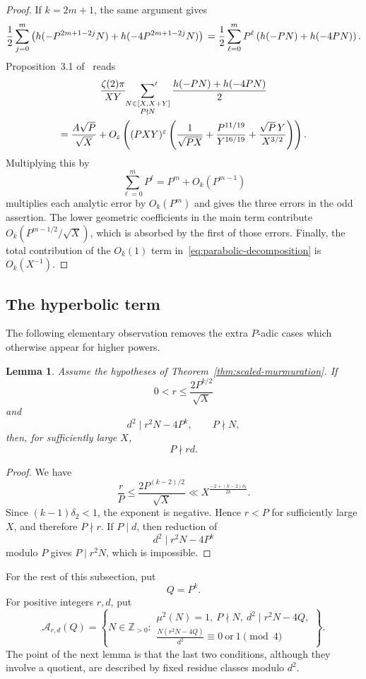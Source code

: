 \documentclass[12pt,reqno]{amsart}
\numberwithin{equation}{section}
\theoremstyle{plain}
\newtheorem{lemma}[theorem]{Lemma}
\theoremstyle{definition}
\theoremstyle{remark}
\begin{document}
\begin{proof}
If $k=2m+1$, the same argument gives
\[
\frac12
\sum_{j=0}^{m}
\left(
h(-P^{2m+1-2j}N)+h(-4P^{2m+1-2j}N)
\right)
\\
=
\frac12
\sum_{\ell=0}^{m}P^\ell
\left(
h(-PN)+h(-4PN)
\right).
\]
Proposition~3.1 of~\cite{Zubrilina2025} reads
\begin{multline}\label{eq:base-odd-parabolic}
\frac{\zeta(2)\pi}{XY}
\sideset{}{'}\sum_{\substack{N\in[X,X+Y]\\P\nmid N}}
\frac{h(-PN)+h(-4PN)}2
\\
=
\frac{A\sqrt P}{\sqrt X}
+
O_\varepsilon\left(
(PXY)^\varepsilon
\left(
\frac1{\sqrt{PX}}
+
\frac{P^{11/19}}{Y^{16/19}}
+
\frac{\sqrt P\,Y}{X^{3/2}}
\right)
\right).
\end{multline}
Multiplying this by
\[
\sum_{\ell=0}^mP^\ell=P^m+O_k(P^{m-1})
\]
multiplies each analytic error by $O_k(P^m)$ and gives the three errors in the odd assertion.  The lower geometric coefficients in the main term contribute
$O_k(P^{m-1/2}/\sqrt X)$, which is absorbed by the first of those errors.
Finally, the total contribution of the $O_k(1)$ term in~\eqref{eq:parabolic-decomposition} is $O_k(X^{-1})$.
\end{proof}

\subsection{The hyperbolic term}

The following elementary observation removes the extra $P$-adic cases which otherwise appear for higher powers.

\begin{lemma}\label{lem:p-coprime}
Assume the hypotheses of Theorem~\ref{thm:scaled-murmuration}.
If
\[
0<r\leq\frac{2P^{k/2}}{\sqrt X}
\]
and
\[
d^2\mid r^2N-4P^k,
\qquad
P\nmid N,
\]
then, for sufficiently large $X$,
\[
P\nmid rd.
\]
\end{lemma}

\begin{proof}
We have
\[
\frac rP
\leq
\frac{2P^{(k-2)/2}}{\sqrt X}
\ll
X^{\frac{-2+(k-2)\delta_2}{2k}}.
\]
Since $(k-1)\delta_2<1$, the exponent is negative.
Hence $r<P$ for sufficiently large $X$, and therefore $P\nmid r$.
If $P\mid d$, then reduction of
\[
d^2\mid r^2N-4P^k
\]
modulo $P$ gives $P\mid r^2N$, which is impossible.
\end{proof}

For the rest of this subsection, put
\[
Q=P^k.
\]
For positive integers $r,d$, put
\[
\mathcal A_{r,d}(Q)
=
\left\{
N\in\mathbb Z_{>0}:
\begin{array}{c}
\mu^2(N)=1,\ P\nmid N,\ d^2\mid r^2N-4Q,\\[1mm]
\displaystyle
\frac{N(r^2N-4Q)}{d^2}\equiv0\ \text{or}\ 1\pmod4
\end{array}
\right\}.
\]
The point of the next lemma is that the last two conditions, although they involve a quotient, are described by fixed residue classes modulo $d^2$.
\end{document}
